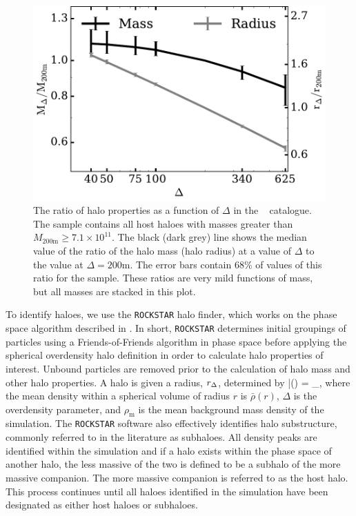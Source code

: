 \documentclass[usenatbib,fleqn]{mnras}
\begin{document}
\begin{figure}
\centering
\includegraphics[width=\columnwidth]{massvsdelta_l0250.pdf}
\caption{
The ratio of halo properties as a function of $\Delta$ in the \simB~ catalogue. The sample contains all host haloes with masses greater than $M_{200\mathrm{m}} \ge 7.1 \times 10^{11}$. The black (dark grey) line shows the median value of the ratio of the halo mass (halo radius) at a value of $\Delta$ to the value at $\Delta=200\mathrm{m}$. The error bars contain 68\% of values of this ratio for the sample. These ratios are 
very mild functions of mass, but all masses are stacked in this plot.}
\label{fig:deltacompare}
\end{figure}

To identify haloes, we use the {\tt ROCKSTAR} halo finder, which works on the phase space algorithm described in \citet*{behroozi_etal13a}. In short, {\tt ROCKSTAR} determines initial groupings of particles using a Friends-of-Friends algorithm in phase space before applying the spherical overdensity halo definition in order to calculate halo properties of interest. Unbound particles are removed prior to the calculation of halo mass and other halo properties. A halo is given a radius, $r_{\Delta}$, determined by
\beq
	\bar{\rho}(\Rdel) = \Delta \rho_{}, 
\eeq
where the mean density within a spherical volume of radius $r$ is $\bar{\rho}(r)$, $\Delta$ is the overdensity parameter, and $\rho_{\mathrm{m}}$ is the mean background mass density of the simulation. The {\tt ROCKSTAR} software also effectively identifies halo substructure, commonly referred to in the literature as subhaloes. All density peaks are identified within the simulation and if a halo exists within the phase space of another halo, the less massive of the two is defined to be a subhalo of the more massive companion. The more massive companion is referred to as the host halo. This process continues until all haloes identified in the simulation have been designated as either host haloes or subhaloes.
\end{document}

